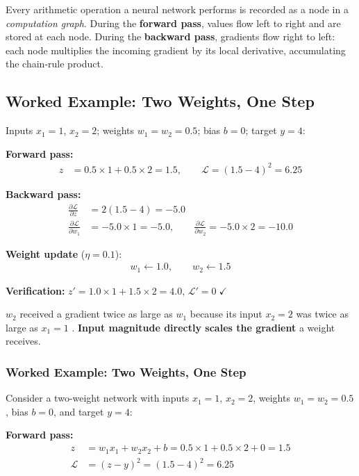 \documentclass[12pt, a4paper]{article}
\begin{document}
Every arithmetic operation a neural network performs is recorded as a node in a
\emph{computation graph}. During the \textbf{forward pass}, values flow left to
right and are stored at each node. During the \textbf{backward pass}, gradients
flow right to left: each node multiplies the incoming gradient by its local
derivative, accumulating the chain-rule product.



\subsection{Worked Example: Two Weights, One Step}

Inputs $x_1 = 1$, $x_2 = 2$; weights $w_1 = w_2 = 0.5$; bias $b = 0$; target
$y = 4$:

\textbf{Forward pass:}
\begin{align}
    z &= 0.5 \times 1 + 0.5 \times 2 = 1.5, \qquad
    \mathcal{L} = (1.5 - 4)^2 = 6.25
\end{align}

\textbf{Backward pass:}
\begin{align}
    \frac{\partial \mathcal{L}}{\partial z} &= 2(1.5-4) = -5.0 \\
    \frac{\partial \mathcal{L}}{\partial w_1} &= -5.0 \times 1 = -5.0, \qquad
    \frac{\partial \mathcal{L}}{\partial w_2}  = -5.0 \times 2 = -10.0
\end{align}

\textbf{Weight update} ($\eta = 0.1$):
\begin{align}
    w_1 \leftarrow 1.0, \qquad w_2 \leftarrow 1.5
\end{align}

\textbf{Verification:} $z' = 1.0 \times 1 + 1.5 \times 2 = 4.0$,
$\mathcal{L}' = 0\;\checkmark$

$w_2$ received a gradient twice as large as $w_1$ because its input $x_2 = 2$
was twice as large as $x_1 = 1$ .\textbf{ Input magnitude directly scales the gradient} a weight receives.

\subsubsection{Worked Example: Two Weights, One Step}

Consider a two-weight network with inputs $x_1 = 1$, $x_2 = 2$, weights
$w_1 = w_2 = 0.5$, bias $b = 0$, and target $y = 4$:

\textbf{Forward pass:}
\begin{align}
    z &= w_1 x_1 + w_2 x_2 + b = 0.5 \times 1 + 0.5 \times 2 + 0 = 1.5
    \label{eq:fwd_z}\\
    \mathcal{L} &= (z - y)^2 = (1.5 - 4)^2 = 6.25
    \label{eq:fwd_L}
\end{align}
\end{document}
